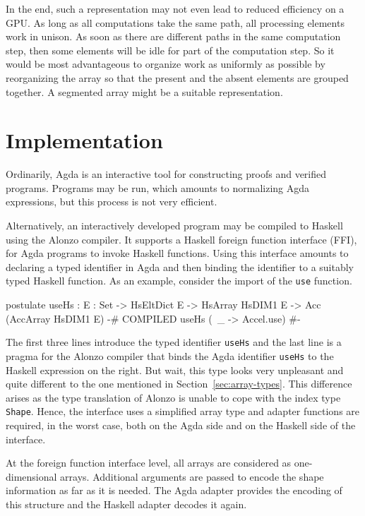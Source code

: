\documentclass{llncs}
\begin{document}
In the end, such a representation may not even lead to reduced efficiency on a GPU. As long
as all computations take the same path, all processing elements work
in unison. As soon as there are different paths in the same
computation step, then some elements will be idle for part of the
computation step. So it would be most advantageous to organize work as
uniformly as possible by reorganizing the array so that the present
and the absent elements are grouped together. A segmented array might
be a suitable representation.


\section{Implementation}
\label{sec:implementation}

Ordinarily, Agda is an interactive tool for constructing proofs and
verified programs. Programs may be run, which amounts to normalizing
Agda expressions, but this process is not very efficient.

Alternatively, an interactively developed program may be compiled to
Haskell using the Alonzo compiler. It supports a Haskell
foreign function interface (FFI), for Agda programs to invoke
Haskell functions. 
Using this interface amounts to declaring a typed identifier in Agda
and then binding the identifier to a suitably typed Haskell
function. As an example, consider the import of the \texttt{use}
function.
\begin{code}
postulate 
  useHs : {E : Set}
      -> HsEltDict E -> HsArray HsDIM1 E -> Acc (AccArray HsDIM1 E)
  {-# COMPILED useHs       (\ _ -> Accel.use) #-}
\end{code}
The first three lines introduce the typed identifier \texttt{useHs}
and the last line is a pragma for the Alonzo compiler that binds the
Agda identifier \texttt{useHs} to the Haskell expression on the right.
But wait, this type looks very unpleasant and quite different to the
one mentioned in Section~\ref{sec:array-types}. This difference arises
as the type translation of Alonzo is unable to cope with the
index type \texttt{Shape}. Hence, the interface uses a
simplified array type and adapter functions are required, in the worst
case, both on the Agda side and on the Haskell side of the interface.

At the foreign function interface level, all arrays are considered as
one-dimensional arrays. Additional arguments are passed to encode the
shape information as far as it is needed. The Agda adapter provides
the encoding of this structure and the Haskell adapter decodes it again. 
\end{document}
